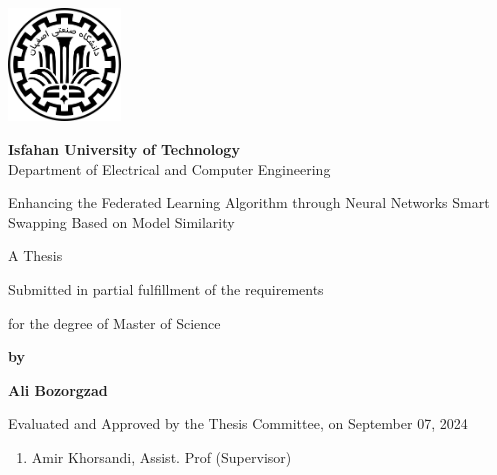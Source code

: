 \thispagestyle{empty}
\begin{latin}
\begin{center}
\includegraphics[height=3cm]{iut_logo.png}
\vspace{0.4cm}

{\large\textbf{Isfahan University of Technology}}\\

\vspace{0.4cm}
Department of Electrical and Computer Engineering

\vspace{2.5cm}

{\Huge
	Enhancing the Federated Learning Algorithm through Neural Networks Smart Swapping Based on Model Similarity
}

\vspace{1.5cm}

{\large
	A Thesis
	
	\vspace{.3cm}
	
	Submitted in partial fulfillment of the requirements
	
	\vspace{.3cm}
	
	for the degree of Master of Science
}

	\vspace{1.5cm}

{\Large
	\textbf{by}
	
	\vspace{.3cm}
	
	\textbf{Ali Bozorgzad}
}
\end{center}

\vfill

Evaluated and Approved by the Thesis Committee, on September 07, 2024
\vspace{0.5cm}

\begin{enumerate}
\item Amir Khorsandi, Assist. Prof (Supervisor)
\vspace{0.5cm}


\end{enumerate}
\end{latin}
